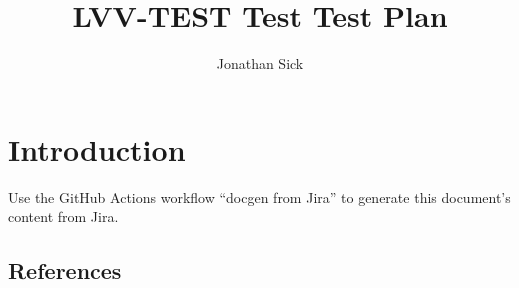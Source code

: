 \documentclass[DM,lsstdraft,toc]{lsstdoc}
\begin{document}
\def\milestoneName{Test}
\def\milestoneId{LVV-TEST}
\def\product{Data Management}


\title{LVV-TEST Test Test Plan }
\setDocRef{\lsstDocType-\lsstDocNum}
\date{\vcsDate}
\author{Jonathan Sick}




\maketitle

\section{Introduction}
Use the GitHub Actions workflow ``docgen from Jira'' to generate this document's content from Jira.

\subsection{References}
\label{sect:references}
\renewcommand{\refname}{}




\end{document}
